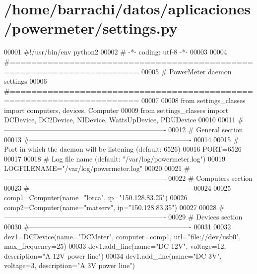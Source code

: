 \hypertarget{settings_8py_source}{\section{/home/barrachi/datos/aplicaciones/powermeter/settings.py}
}

\begin{DoxyCode}
00001 \textcolor{comment}{#!/usr/bin/env python2}
00002 \textcolor{comment}{# -*- coding: utf-8 -*-}
00003 
00004 \textcolor{comment}{#======================================================================}
00005 \textcolor{comment}{# PowerMeter daemon settings}
00006 \textcolor{comment}{#======================================================================}
00007 
00008 \textcolor{keyword}{from} settings\_classes \textcolor{keyword}{import} computers, devices, Computer
00009 \textcolor{keyword}{from} settings\_classes \textcolor{keyword}{import} DCDevice, DC2Device, NIDevice, WattsUpDevice, 
      PDUDevice
00010 
00011 \textcolor{comment}{#----------------------------------------------------------------------}
00012 \textcolor{comment}{# General section}
00013 \textcolor{comment}{#----------------------------------------------------------------------}
00014 
00015 \textcolor{comment}{# Port in which the daemon will be listening (default: 6526)}
00016 PORT=6526
00017 
00018 \textcolor{comment}{# Log file name (default: "/var/log/powermeter.log")}
00019 LOGFILENAME=\textcolor{stringliteral}{"/var/log/powermeter.log"}
00020 
00021 \textcolor{comment}{#----------------------------------------------------------------------}
00022 \textcolor{comment}{# Computers section}
00023 \textcolor{comment}{#----------------------------------------------------------------------}
00024 
00025 comp1=Computer(name=\textcolor{stringliteral}{"lorca"}, ip=\textcolor{stringliteral}{"150.128.83.25"})
00026 comp2=Computer(name=\textcolor{stringliteral}{"matserv"}, ip=\textcolor{stringliteral}{"150.128.83.35"})
00027 
00028 \textcolor{comment}{#----------------------------------------------------------------------}
00029 \textcolor{comment}{# Devices section}
00030 \textcolor{comment}{#----------------------------------------------------------------------}
00031 
00032 dev1=DCDevice(name=\textcolor{stringliteral}{"DCMeter"}, computer=comp1, url=\textcolor{stringliteral}{"file://dev/usb0"}, 
      max\_frequency=25)
00033 dev1.add\_line(name=\textcolor{stringliteral}{"DC 12V"}, voltage=12, description=\textcolor{stringliteral}{"A 12V power line"})
00034 dev1.add\_line(name=\textcolor{stringliteral}{"DC 3V"}, voltage=3, description=\textcolor{stringliteral}{"A 3V power line"})

\end{DoxyCode}
